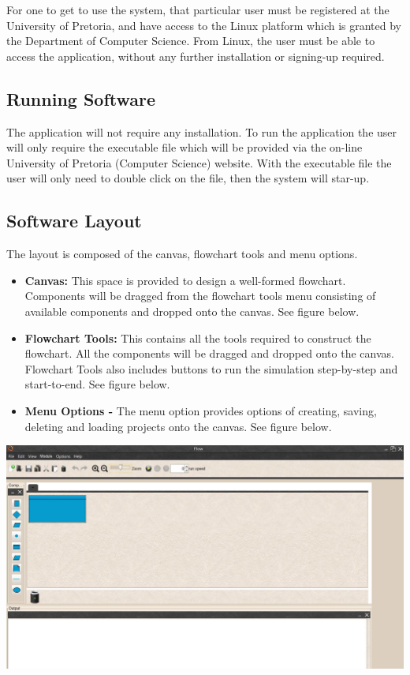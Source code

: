 \documentclass[11pt,a4paper,titlepage]{article}
\begin{document}
	For one to get to use the system, that particular user must be registered at the University of Pretoria, and have access to the Linux platform which is granted by the Department of Computer Science. From Linux, the user must be able to access the application, without any further installation or signing-up required.
	
	\subsection{Running Software}
		The application will not require any installation. To run the 			application the user will only require the executable file which will be provided via the on-line University of Pretoria (Computer Science) website. With the executable file the user will only need to double click on the file, then the system will star-up.
		
		\subsection{Software Layout}
		The layout is composed of the canvas, flowchart tools and menu options. \newline
		
		\begin{itemize}
			\item \textbf{Canvas:} This space is provided to design a 			well-formed flowchart. Components will be dragged from the flowchart 				tools menu consisting of available components and dropped onto the 				canvas. See figure below.
			
			\item \textbf{Flowchart Tools:} This contains all the tools 				required to construct the flowchart. All the components will be 			dragged and dropped onto the canvas. Flowchart Tools also includes 				buttons to run the simulation step-by-step and start-to-end. See figure below.
			
			\item \textbf{Menu Options -} The menu option provides options of 				creating, saving, deleting and loading projects onto the canvas. See figure below.
			
		\end{itemize}
	
	\includegraphics[width=\textwidth]{ManualDemo.jpg}
	\newpage
\end{document}
